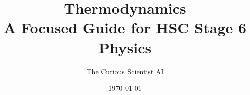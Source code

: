 \documentclass[justified,notoc]{tufte-book}
\title{Thermodynamics\\ %
\large A Focused Guide for HSC Stage 6 Physics} %
\author{The Curious Scientist AI}
\date{\today}
\begin{document}
\maketitle



\FloatBarrier %

% 

% 

%


\FloatBarrier %


% 
\end{document}
